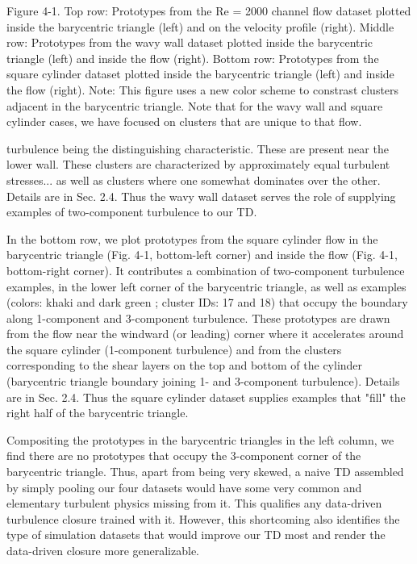Figure 4-1. Top row: Prototypes from the Re = 2000 channel ﬂow dataset plotted inside the barycentric triangle
(left) and on the velocity proﬁle (right). Middle row: Prototypes from the wavy wall dataset plotted inside the
barycentric triangle (left) and inside the ﬂow (right). Bottom row: Prototypes from the square cylinder dataset
plotted inside the barycentric triangle (left) and inside the ﬂow (right). Note: This ﬁgure uses a new color
scheme to constrast clusters adjacent in the barycentric triangle. Note that for the wavy wall and square
cylinder cases, we have focused on clusters that are unique to that ﬂow.

turbulence being the distinguishing characteristic. These are present near the lower wall. These clusters are
characterized by approximately equal turbulent stresses... as well as clusters where one
somewhat dominates over the other. Details are in Sec. 2.4. Thus the wavy wall dataset serves the role of supplying examples of two-component turbulence to our TD.

In the bottom row, we plot prototypes from the square cylinder ﬂow in the barycentric triangle (Fig. 4-1,
bottom-left corner) and inside the ﬂow (Fig. 4-1, bottom-right corner). It contributes a combination of
two-component turbulence examples, in the lower left corner of the barycentric triangle, as well as
examples (colors: khaki and dark green ; cluster IDs: 17 and 18) that occupy the boundary along
1-component and 3-component turbulence. These prototypes are drawn from the ﬂow near the windward
(or leading) corner where it accelerates around the square cylinder (1-component turbulence) and from the
clusters corresponding to the shear layers on the top and bottom of the cylinder (barycentric triangle
boundary joining 1- and 3-component turbulence). Details are in Sec. 2.4. Thus the square cylinder dataset
supplies examples that "fill" the right half of the barycentric triangle.

Compositing the prototypes in the barycentric triangles in the left column, we ﬁnd there are no prototypes
that occupy the 3-component corner of the barycentric triangle. Thus, apart from being very skewed, a
naive TD assembled by simply pooling our four datasets would have some very common and elementary
turbulent physics missing from it. This qualiﬁes any data-driven turbulence closure trained with it.
However, this shortcoming also identiﬁes the type of simulation datasets that would improve our TD most
and render the data-driven closure more generalizable.

